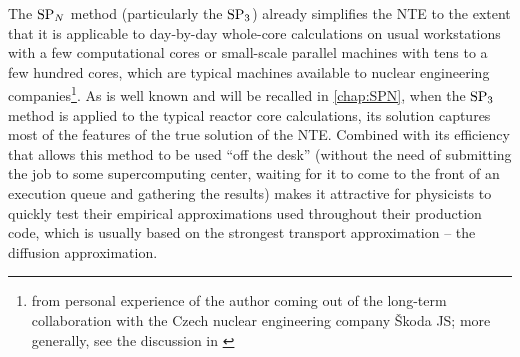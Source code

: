 The $\SPN$ method (particularly the $\SPN[3]$) already simplifies the NTE to the extent that it is applicable to
day-by-day whole-core calculations on usual workstations with a few computational cores or small-scale parallel machines
with tens to a few hundred cores, which are typical machines available to nuclear engineering
companies\footnote{\label{sjsexp}from personal experience of the author coming out of the long-term collaboration with
the Czech nuclear engineering company {\v S}koda JS; more generally, see the discussion in \cite[Sec.
2.4]{Sanchez7}}. As is well known and will be recalled in \ref{chap:SPN}, when the $\SPN[3]$ method is applied to the
typical reactor core calculations, its solution captures most of the features of the true solution of the NTE. Combined
with its efficiency that allows this method to be used ``off the desk'' (without the need of submitting the job to some
supercomputing center, waiting for it to come to the front of an execution queue and gathering the results) makes it
attractive for physicists to quickly test their empirical approximations used throughout their production code, which is
usually based on the strongest transport approximation -- the diffusion approximation.

